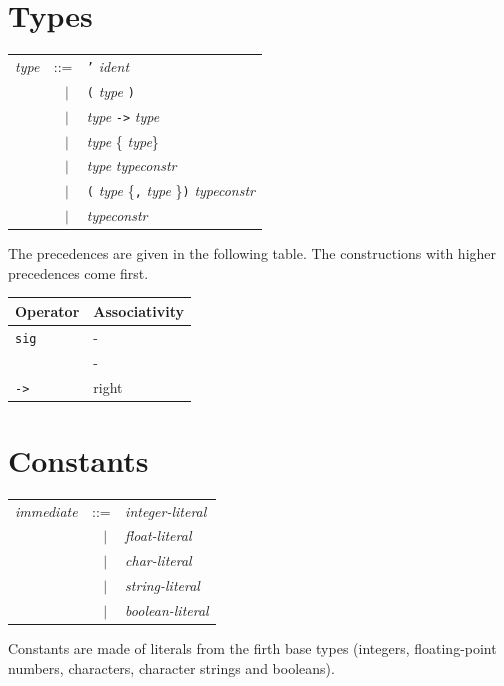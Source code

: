 \documentclass[11pt,titlepage,twoside]{report}
\newcommand{\alt}{\;|\;}
\newcommand{\term}[1]{{\tt #1}}
\newcommand{\nterm}[1]{{\em #1}}
\begin{document}
\section{Types}
\begin{center}
\begin{tabular}{lcl}
\nterm{type} & ::=        & \term{'} \nterm{ident} \\
             & $\;\;\alt$ & \term{(} \nterm{type} \term{)} \\
             & $\;\;\alt$ & \nterm{type} \term{->} \nterm{type} \\
             & $\;\;\alt$ & \nterm{type} \{\term{*} \nterm{type}\} \\
             & $\;\;\alt$ & \nterm{type} \nterm{typeconstr} \\
             & $\;\;\alt$ & \term{(} \nterm{type} \{\term{,}
                            \nterm{type} \}\term{)} \nterm{typeconstr} \\
             & $\;\;\alt$ & \nterm{typeconstr}
\end{tabular}
\end{center}

The precedences are given in the following table. The constructions
with higher precedences come first.
\begin{center}
\begin{tabular}{|l|l|}
\hline
Operator                        & Associativity \\ \hline
{\tt sig}                       & -            \\ 
{\tt *}                         & -             \\
{\tt ->}                        & right         \\ \hline
\end{tabular}
\end{center}

\section{Constants}

\begin{center}
\begin{tabular}{lcl}
\nterm{immediate} & ::=           & \nterm{integer-literal} \\
                  & $\;\;\alt$    & \nterm{float-literal} \\
                  & $\;\;\alt$    & \nterm{char-literal} \\
                  & $\;\;\alt$    & \nterm{string-literal} \\
                  & $\;\;\alt$    & \nterm{boolean-literal} \\
\end{tabular}
\end{center}
Constants are made of literals from the firth base types (integers,
floating-point numbers, characters, character strings and booleans).
\end{document}
